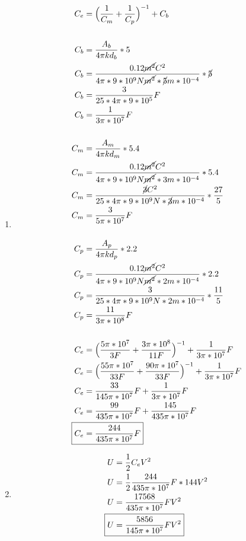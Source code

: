 \documentclass[10pt, twoside]{article}
\begin{document}
\begin{enumerate}[label=\alph*.]
	\item
		\begin{align*}
			C_e &= \Big{(} \frac{1}{C_m}+\frac{1}{C_p} \Big{)}^{-1}+C_b\\
			\\
			C_b &= \frac{A_b}{4\pi k d_b}*5\\
			C_b &= \frac{0.12\cancel{m^2}C^2}{4\pi *9*10^9N\cancel{m^2} *\cancel{5}m*10^{-4}}*\cancel{5}\\
			C_b &= \frac{3}{25*4\pi*9*10^5}F\\
			C_b &= \frac{1}{3\pi*10^7}F\\
			\\
			C_m &= \frac{A_m}{4\pi k d_m}*5.4\\
			C_m &= \frac{0.12\cancel{m^2}C^2}{4\pi*9*10^9N\cancel{m^2}*3m*10^{-4}}*5.4\\
			C_m &= \frac{\cancel{3}C^2}{25*4\pi*9*10^9N*\cancel{3}m*10^{-4}}* \frac{27}{5} \\
			C_m &= \frac{3}{5\pi*10^7}F\\
			\\
			C_p &= \frac{A_p}{4\pi k d_p}*2.2\\
			C_p &= \frac{0.12\cancel{m^2}C^2}{4\pi*9*10^9N\cancel{m^2}*2m*10^{-4}}* 2.2 \\
			C_p &= \frac{3}{25*4\pi*9*10^9N*2m*10^{-4}}* \frac{11}{5} \\
			C_p &= \frac{11}{3\pi*10^8}F\\
			\\
			C_e &= \Big{(} \frac{5\pi*10^7}{3F}+\frac{3\pi*10^8}{11F} \Big{)}^{-1}+\frac{1}{3\pi*10^7}F\\
			C_e &= \Big{(} \frac{55\pi*10^7}{33F}+\frac{90\pi*10^7}{33F} \Big{)}^{-1}+\frac{1}{3\pi*10^7}F\\
			C_e &= \frac{33}{145\pi*10^7}F +\frac{1}{3\pi*10^7}F\\
			C_e &= \frac{99}{435\pi*10^7}F +\frac{145}{435\pi*10^7}F\\
			\Aboxed
			{
				C_e &= \frac{244}{435\pi*10^7}F
			}
		\end{align*}
	\item
		\begin{align*}
			U &= \frac{1}{2} C_eV^2\\
			U &= \frac{1}{2} \frac{244}{435\pi*10^7}F*144V^2\\
			U &= \frac{17568}{435\pi*10^7}FV^2\\
			\Aboxed
			{
				U &= \frac{5856}{145\pi*10^7}FV^2
			}

\end{align*}
\end{enumerate}
\end{document}
